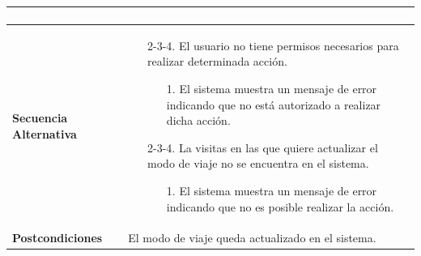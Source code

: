 \begin{longtable}{| p{4cm} | p{10cm} |}
\begin{enumerate}[leftmargin=0.7cm, topsep=0.1cm]
\end{enumerate}


\\
\hline
\textbf{Secuencia Alternativa} &\mbox{}\par\vspace{-\baselineskip}

\begin{enumerate}[leftmargin=1.2cm, topsep=0.1cm]
\item[2-3-4.] El usuario no tiene permisos necesarios para realizar determinada acción.
	\begin{itemize}
	\item[1.] El sistema muestra un mensaje de error indicando que no está autorizado a realizar dicha acción.
	\end{itemize}
\item[2-3-4.] La visitas en las que quiere actualizar el modo de viaje no se encuentra en el sistema.
	\begin{itemize}
	\item[1.] El sistema muestra un mensaje de error indicando que no es posible realizar la acción.
	\end{itemize}
\end{enumerate}

\\
\hline
\textbf{Postcondiciones} & 
El modo de viaje queda actualizado en el sistema.\\
\hline
\end{longtable}



\newpage
